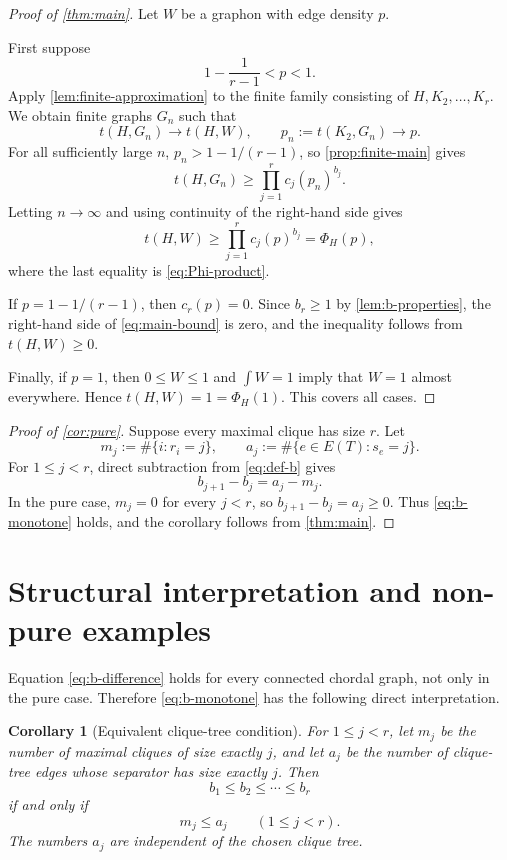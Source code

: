 \documentclass[11pt]{article}
\newtheorem{corollary}[corollary]{Corollary}
\numberwithin{equation}{section}
\newcommand{\PhiH}{\Phi_H}
\begin{document}
\begin{proof}[Proof of \cref{thm:main}]
Let $W$ be a graphon with edge density $p$.

First suppose
\[
 1-\frac{1}{r-1}<p<1.
\]
Apply \cref{lem:finite-approximation} to the finite family consisting of
$H,K_2,\dots,K_r$.  We obtain finite graphs $G_n$ such that
\[
 t(H,G_n)\to t(H,W),
 \qquad
 p_n:=t(K_2,G_n)\to p.
\]
For all sufficiently large $n$,
$p_n>1-1/(r-1)$, so \cref{prop:finite-main} gives
\[
 t(H,G_n)\geq\prod_{j=1}^r c_j(p_n)^{b_j}.
\]
Letting $n\to\infty$ and using continuity of the right-hand side gives
\[
 t(H,W)\geq\prod_{j=1}^r c_j(p)^{b_j}=\PhiH(p),
\]
where the last equality is \eqref{eq:Phi-product}.

If $p=1-1/(r-1)$, then $c_r(p)=0$.  Since
$b_r\geq1$ by \cref{lem:b-properties}, the right-hand side of
\eqref{eq:main-bound} is zero, and the inequality follows from
$t(H,W)\geq0$.

Finally, if $p=1$, then $0\leq W\leq1$ and
$\int W=1$ imply that $W=1$ almost everywhere.  Hence
$t(H,W)=1=\PhiH(1)$.  This covers all cases.
\end{proof}

\begin{proof}[Proof of \cref{cor:pure}]
Suppose every maximal clique has size $r$.  Let
\[
 m_j:=\#\{i:r_i=j\},
 \qquad
 a_j:=\#\{e\in E(T):s_e=j\}.
\]
For $1\leq j<r$, direct subtraction from \eqref{eq:def-b} gives
\begin{equation}
 b_{j+1}-b_j=a_j-m_j.\label{eq:b-difference}
\end{equation}
In the pure case, $m_j=0$ for every $j<r$, so
$b_{j+1}-b_j=a_j\geq0$.  Thus \eqref{eq:b-monotone} holds, and the
corollary follows from \cref{thm:main}.
\end{proof}

\section{Structural interpretation and non-pure examples}
\label{sec:structure}

Equation \eqref{eq:b-difference} holds for every connected chordal graph,
not only in the pure case.  Therefore \eqref{eq:b-monotone} has the
following direct interpretation.

\begin{corollary}[Equivalent clique-tree condition]\label{cor:structural}
For $1\leq j<r$, let $m_j$ be the number of maximal cliques of size
exactly $j$, and let $a_j$ be the number of clique-tree edges whose
separator has size exactly $j$.  Then
\[
 b_1\leq b_2\leq\cdots\leq b_r
\]
if and only if
\begin{equation}
 m_j\leq a_j
 \qquad(1\leq j<r).\label{eq:structural-condition}
\end{equation}
The numbers $a_j$ are independent of the chosen clique tree.
\end{corollary}
\end{document}
